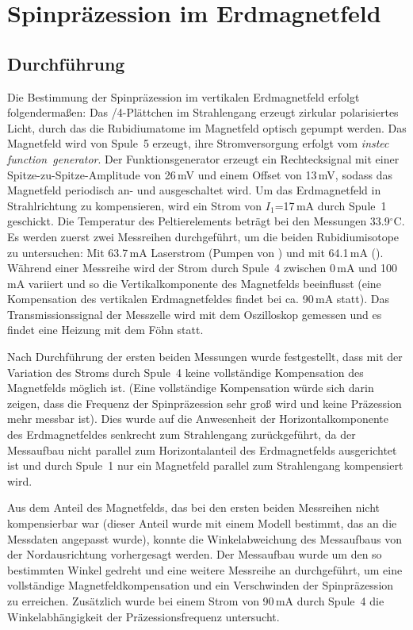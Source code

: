 \section{Spinpräzession im Erdmagnetfeld}
\subsection{Durchführung}
Die Bestimmung der Spinpräzession im vertikalen Erdmagnetfeld erfolgt folgendermaßen:
Das \textlambda/4-Plättchen im Strahlengang erzeugt zirkular polarisiertes Licht,
durch das die Rubidiumatome im Magnetfeld optisch gepumpt werden.
Das Magnetfeld wird von Spule~5 erzeugt, ihre Stromversorgung erfolgt vom \emph{instec function~generator}.
Der Funktionsgenerator erzeugt ein Rechtecksignal mit einer Spitze-zu-Spitze-Amplitude von 26\,mV und
einem Offset von 13\,mV, sodass das Magnetfeld periodisch an- und ausgeschaltet wird.
Um das Erdmagnetfeld in Strahlrichtung zu kompensieren,
wird ein Strom von $I_1$=17\,mA durch Spule~1 geschickt.
Die Temperatur des Peltierelements beträgt bei den Messungen 33.9$^\circ$C.
Es werden zuerst zwei Messreihen durchgeführt, um die beiden Rubidiumisotope zu untersuchen:
Mit 63.7\,mA Laserstrom (Pumpen von ) und mit 64.1\,mA ().
Während einer Messreihe wird der Strom durch Spule~4 zwischen 0\,mA und 100\,mA variiert und
so die Vertikalkomponente des Magnetfelds beeinflusst
(eine Kompensation des vertikalen Erdmagnetfeldes findet bei ca. 90\,mA statt).
Das Transmissionssignal der Messzelle wird mit dem Oszilloskop gemessen und
es findet eine Heizung mit dem Föhn statt.

Nach Durchführung der ersten beiden Messungen wurde festgestellt,
dass mit der Variation des Stroms durch Spule~4 keine vollständige Kompensation des Magnetfelds möglich ist.
(Eine vollständige Kompensation würde sich darin zeigen,
dass die Frequenz der Spinpräzession sehr groß wird und keine Präzession mehr messbar ist).
Dies wurde auf die Anwesenheit der Horizontalkomponente des Erdmagnetfeldes
senkrecht zum Strahlengang zurückgeführt, da der Messaufbau nicht parallel zum Horizontalanteil des
Erdmagnetfelds ausgerichtet ist und durch Spule~1 nur ein Magnetfeld parallel zum Strahlengang kompensiert wird.

Aus dem Anteil des Magnetfelds, das bei den ersten beiden Messreihen nicht kompensierbar war
(dieser Anteil wurde mit einem Modell bestimmt, das an die Messdaten angepasst wurde),
konnte die Winkelabweichung des Messaufbaus von der Nordausrichtung vorhergesagt werden.
Der Messaufbau wurde um den so bestimmten Winkel gedreht und eine weitere Messreihe an  durchgeführt,
um eine vollständige Magnetfeldkompensation und ein Verschwinden der Spinpräzession zu erreichen.
Zusätzlich wurde bei einem Strom von 90\,mA durch Spule~4 die Winkelabhängigkeit der Präzessionsfrequenz untersucht.


